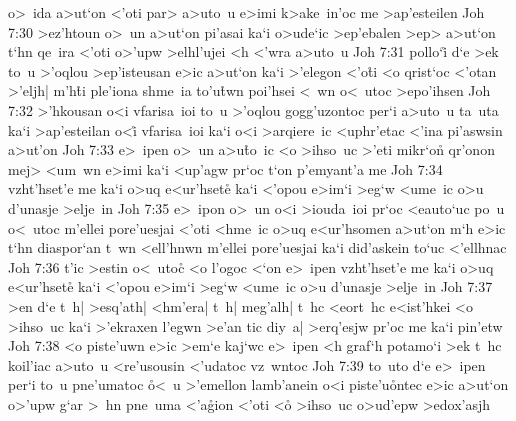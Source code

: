 o>~ida
a>ut`on
<'oti
par>
a>uto~u
e>imi
k>ake~in'oc
me
>ap'esteilen\bibvsend
\vs Joh 7:30
>ez'htoun
o>~un
a>ut`on
pi'asai
ka`i
o>ude`ic
>ep'ebalen
>ep>
a>ut`on
t`hn
qe~ira
<'oti
o>'upw
>elhl'ujei
<h
<'wra
a>uto~u\bibvsend
\vs Joh 7:31
pollo`i\r{}
d`e
>ek
to~u
>'oqlou
>ep'isteusan
e>ic
a>ut`on
ka`i
>'elegon
<'o\r{t}i
<o
qrist`oc
<'otan
>'eljh|
m'h\r{t}i
ple'iona
shme~ia
to'u\r{t}wn
poi'hsei
<~wn
o<~utoc
>epo'ihsen\bibvsend
\vs Joh 7:32
>'hkousan
o<i
vfarisa~ioi
to~u
>'oqlou
gogg'uzontoc
per`i
a>uto~u
ta~uta
ka`i
>ap'esteilan
o<i\r{}
vfarisa~ioi
ka`i
o<i
>arqiere~ic
<uphr'etac
<'ina
pi'aswsin
a>ut'on\bibvsend
\vs Joh 7:33
e>~ipen
o>~un
a>u\r{t}o~ic
<o
>ihso~uc
>'eti
mikr`on\r{}
qr'onon
mej>
<um~wn
e>imi
ka`i
<up'agw
pr`oc
t`on
p'emyant'a
me\bibvsend
\vs Joh 7:34
vzht'hset'e
me
ka`i
o>uq
e<ur'hset\r{e}
ka`i
<'opou
e>im`i
>eg`w
<ume~ic
o>u
d'unasje
>elje~in\bibvsend
\vs Joh 7:35
e>~ipon
o>~un
o<i
>iouda~ioi
pr`oc
<eauto`uc
po~u
o<~utoc
m'ellei
pore'uesjai
<'oti
<hme~ic
o>uq
e<ur'hsomen
a>ut`on
m`h
e>ic
t`hn
diaspor`an
t~wn
<ell'hnwn
m'ellei
pore'uesjai
ka`i
did'askein
to`uc
<'ellhnac\bibvsend
\vs Joh 7:36
t'ic
>estin
o<~utoc\r{}
<o
l'ogoc
<`on
e>~ipen
vzht'hset'e
me
ka`i
o>uq
e<ur'hset\r{e}
ka`i
<'opou
e>im`i
>eg`w
<ume~ic
o>u
d'unasje
>elje~in\bibvsend
\vs Joh 7:37
>en
d`e
t~h|
>esq'ath|
<hm'era|
t~h|
meg'alh|
t~hc
<eort~hc
e<ist'hkei
<o
>ihso~uc
ka`i
>'ekraxen
l'egwn
>e'an
tic
diy~a|
>erq'esjw
pr'oc
me
ka`i
pin'etw\bibvsend
\vs Joh 7:38
<o
piste'uwn
e>ic
>em`e
kaj`wc
e>~ipen
<h
graf`h
potamo`i
>ek
t~hc
koil'iac
a>uto~u
<re'usousin
<'udatoc
vz~wntoc\bibvsend
\vs Joh 7:39
to~uto
d`e
e>~ipen
per`i
to~u
pne'umatoc
\r{o}<~u
>'emellon
lamb'anein
o<i
piste'u\r{o}ntec
e>ic
a>ut`on
o>'upw
g`ar
>~hn
pne~uma
<'a\r{g}ion
<'oti
<o\r{}
>ihso~uc
o>ud'epw
>edox'asjh\bibvsend
